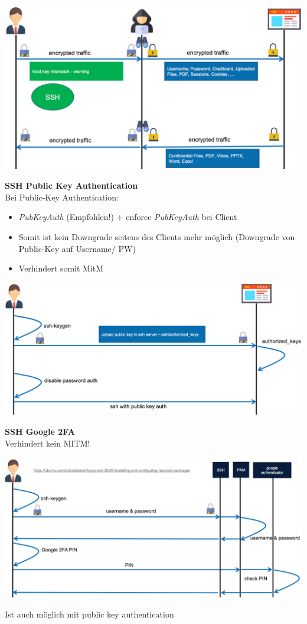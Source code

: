 \begin{center}
    \vspace{-8pt}
    \includegraphics[width=.8\linewidth]{./img/09-mitm/ssh_overview}
    \vspace{-8pt}
\end{center}

\textbf{SSH Public Key Authentication}\\
Bei Public-Key Authentication:
\begin{itemize}
    \item \textit{PubKeyAuth} (Empfohlen!) + enforce \textit{PubKeyAuth} bei Client
    \item Somit ist kein Downgrade seitens des Clients  mehr möglich (Downgrade von Public-Key auf Username/ PW)
    \item Verhindert somit MitM
\end{itemize}

\begin{center}
    \vspace{-8pt}
    \includegraphics[width=.8\linewidth]{./img/09-mitm/pk_auth}
    \vspace{-8pt}
\end{center}

\textbf{SSH Google 2FA}\\
Verhindert kein MITM!
\begin{center}
    \vspace{-8pt}
    \includegraphics[width=.8\linewidth]{./img/09-mitm/ssh_2fa}
    \vspace{-8pt}
\end{center}
Ist auch möglich mit public key authentication

